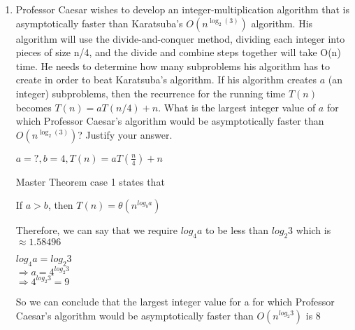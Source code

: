 \documentclass[11pt]{amsart}
\begin{document}
\begin{enumerate}
\item Professor Caesar wishes to develop an integer-multiplication algorithm that is asymptotically faster than Karatsuba’s $O(n^{\log_2(3)})$ algorithm. His algorithm will use the divide-and-conquer method, dividing each integer into pieces of size n/4, and the divide and combine steps together will take O(n) time. He needs to determine how many subproblems his algorithm has to create in order to beat Karatsuba’s algorithm. If his algorithm creates $a$ (an integer) subproblems, then the recurrence for the running time $T(n)$ becomes $T(n) = aT(n/4) + n$. What is the largest integer value of $a$ for which Professor Caesar’s algorithm would be asymptotically faster than $O(n^{\log_2(3)})$? Justify your answer.
\bigskip
\begin{center}
	$a = ?, b = 4, T(n) = aT(\frac{n}{4}) + n$
\end{center}
Master Theorem case 1 states that
\begin{center}
	If $a > b$, then $T(n) = \theta(n^{log_b{a}})$
\end{center}
Therefore, we can say that we require $log_4{a}$ to be less than $log_2{3}$ which is $\approx1.58496$
\begin{center}
	$log_4{a} = log_2{3}$\\
	$\Rightarrow a = 4^{log_2{3}}$\\
	$\Rightarrow 4^{log_2{3}} = 9$
\end{center}
So we can conclude that the largest integer value for a for which Professor Caesar's algorithm would be asymptotically faster than $O(n^{log_2{3}})$ is 8
\end{enumerate}
\end{document}
